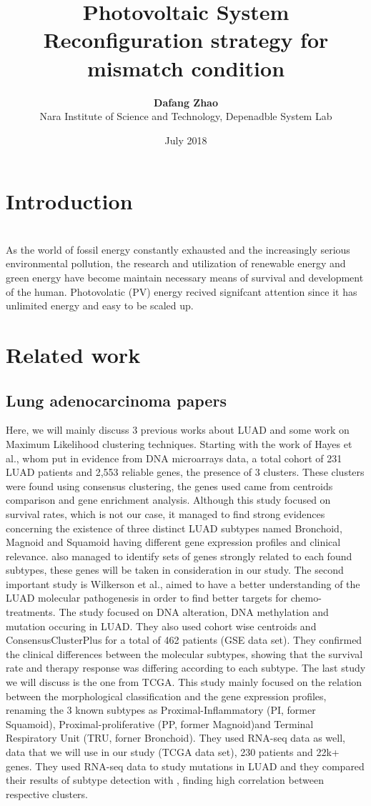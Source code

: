 \documentclass[twocolumn]{article}
\title{\textbf{Photovoltaic System Reconfiguration strategy for mismatch condition}}%
\date{July 2018}
\author{\textbf{Dafang Zhao}\\Nara Institute of Science and Technology, Depenadble System Lab}
\begin{document}
\maketitle

\section{Introduction}
\\As the world of fossil energy constantly exhausted and the increasingly serious environmental pollution, the research and utilization of renewable energy and green energy have become maintain necessary means of survival and development of the human. Photovolatic (PV) energy recived signifcant attention since it has unlimited energy and easy to be scaled up.

\section{Related work}
\subsection{Lung adenocarcinoma papers}

Here, we will mainly discuss 3 previous works about LUAD and some work on Maximum Likelihood clustering techniques.
Starting with the work of Hayes et al.\cite{hayes}, whom put in evidence from DNA microarrays data, a total cohort of 231 LUAD patients and 2,553 reliable genes, the presence of 3 clusters.
These clusters were found using consensus clustering\cite{cons}, the genes used came from centroids comparison and gene enrichment analysis.
Although this study focused on survival rates, which is not our case, it managed to find strong evidences concerning the existence of three distinct LUAD subtypes named Bronchoid, Magnoid and Squamoid having different gene expression profiles and clinical relevance. \cite{hayes} also managed to identify sets of genes strongly related to each found subtypes, these genes will be taken in consideration in our study.
The second important study is Wilkerson et al.\cite{wilk}, aimed to have a better understanding of the LUAD molecular pathogenesis in order to find better targets for chemo-treatments.
The study focused on DNA alteration, DNA methylation and mutation occuring in LUAD.
They also used cohort wise centroids and ConsensusClusterPlus\cite{consensusPlus} for a total of 462 patients (GSE data set).
They confirmed the clinical differences between the molecular subtypes, showing that the survival rate and therapy response was differing according to each subtype.
The last study we will discuss is the one from TCGA\cite{TCGA}.
This study mainly focused on the relation between the morphological classification and the gene expression profiles, renaming the 3 known subtypes as Proximal-Inflammatory (PI, former Squamoid), Proximal-proliferative (PP, former Magnoid)and Terminal Respiratory Unit (TRU, forner Bronchoid).
They used RNA-seq data as well, data that we will use in our study (TCGA data set), 230 patients and 22k+ genes.
They used RNA-seq data to study mutations in LUAD and they compared their results of subtype detection with \cite{wilk}, finding high correlation between respective clusters.
\end{document}
